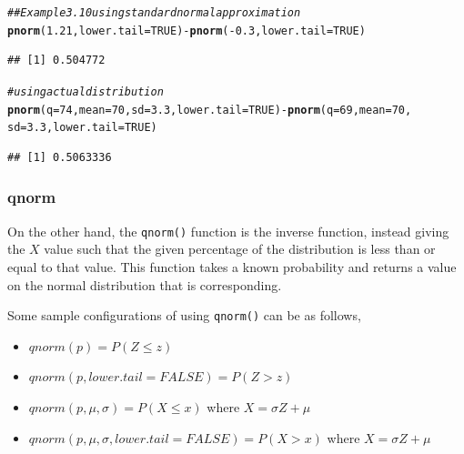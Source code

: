 \documentclass{report}\usepackage[]{graphicx}\usepackage[]{color}
\makeatletter
\newcommand{\hlnum}[1]{\textcolor[rgb]{0.686,0.059,0.569}{#1}}%
\newcommand{\hlcom}[1]{\textcolor[rgb]{0.678,0.584,0.686}{\textit{#1}}}%
\newcommand{\hlopt}[1]{\textcolor[rgb]{0,0,0}{#1}}%
\newcommand{\hlstd}[1]{\textcolor[rgb]{0.345,0.345,0.345}{#1}}%
\newcommand{\hlkwc}[1]{\textcolor[rgb]{0.333,0.667,0.333}{#1}}%
\newcommand{\hlkwd}[1]{\textcolor[rgb]{0.737,0.353,0.396}{\textbf{#1}}}%
\newenvironment{kframe}{%
 \def\at@end@of@kframe{}%
 \ifinner\ifhmode%
  \def\at@end@of@kframe{\end{minipage}}%
  \begin{minipage}{\columnwidth}%
 \fi\fi%
 \def\FrameCommand##1{\hskip\@totalleftmargin \hskip-\fboxsep
 \colorbox{shadecolor}{##1}\hskip-\fboxsep
     \hskip-\linewidth \hskip-\@totalleftmargin \hskip\columnwidth}%
 \MakeFramed {\advance\hsize-\width
   \@totalleftmargin\z@ \linewidth\hsize
   \@setminipage}}%
 {\par\unskip\endMakeFramed%
 \at@end@of@kframe}
\newenvironment{knitrout}{}{} %
\makeatother
\begin{document}
\begin{knitrout}
\color{fgcolor}\begin{kframe}
\begin{alltt}
\hlcom{## Example 3.10 using standard normal approximation}
\hlkwd{pnorm}\hlstd{(}\hlnum{1.21}\hlstd{,} \hlkwc{lower.tail} \hlstd{=} \hlnum{TRUE}\hlstd{)} \hlopt{-} \hlkwd{pnorm}\hlstd{(}\hlopt{-}\hlnum{0.3}\hlstd{,} \hlkwc{lower.tail} \hlstd{=} \hlnum{TRUE}\hlstd{)}
\end{alltt}
\begin{verbatim}
## [1] 0.504772
\end{verbatim}
\begin{alltt}
\hlcom{# using actual distribution}
\hlkwd{pnorm}\hlstd{(}\hlkwc{q} \hlstd{=} \hlnum{74}\hlstd{,} \hlkwc{mean} \hlstd{=} \hlnum{70}\hlstd{,} \hlkwc{sd} \hlstd{=} \hlnum{3.3}\hlstd{,} \hlkwc{lower.tail} \hlstd{=} \hlnum{TRUE}\hlstd{)} \hlopt{-} \hlkwd{pnorm}\hlstd{(}\hlkwc{q} \hlstd{=} \hlnum{69}\hlstd{,} \hlkwc{mean} \hlstd{=} \hlnum{70}\hlstd{,}
    \hlkwc{sd} \hlstd{=} \hlnum{3.3}\hlstd{,} \hlkwc{lower.tail} \hlstd{=} \hlnum{TRUE}\hlstd{)}
\end{alltt}
\begin{verbatim}
## [1] 0.5063336
\end{verbatim}
\end{kframe}
\end{knitrout}


\subsubsection{qnorm} 
On the other hand, the \texttt{qnorm()} function is the inverse function, instead giving the $X$ value such that the given percentage of the distribution is less than or equal to that value. This function takes a known probability and returns a value on the normal distribution that is corresponding.  

Some sample configurations of using \texttt{qnorm()} can be as follows,  
\begin{itemize}
\item $qnorm(p) = P(Z \leq z)$ 
\item $qnorm(p, lower.tail = FALSE) = P(Z > z)$ 
\item $qnorm(p, \mu, \sigma) = P(X \leq x)$ where $X = \sigma Z + \mu$ 
\item $qnorm(p, \mu, \sigma, lower.tail = FALSE) = P(X > x)$ where $X = \sigma Z + \mu$ 
\end{itemize}
\end{document}
